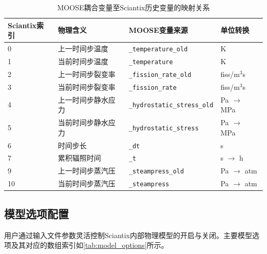 \begin{table}[htbp]
	\centering
	\caption{MOOSE耦合变量至Sciantix历史变量的映射关系}
	\label{tab:history_map}
	\begin{tabularx}{\textwidth}{lllX}
		\toprule
		Sciantix索引 & 物理含义 & MOOSE变量来源 & 单位转换 \\
		\midrule
		0 & 上一时间步温度 & \texttt{\_temperature\_old} & K \\
		1 & 当前时间步温度 & \texttt{\_temperature} & K \\
		2 & 上一时间步裂变率 & \texttt{\_fission\_rate\_old} & fiss/m$^3$s \\
		3 & 当前时间步裂变率 & \texttt{\_fission\_rate} & fiss/m$^3$s \\
		4 & 上一时间步静水应力 & \texttt{\_hydrostatic\_stress\_old} & Pa $\to$ MPa \\
		5 & 当前时间步静水应力 & \texttt{\_hydrostatic\_stress} & Pa $\to$ MPa \\
		6 & 时间步长 & \texttt{\_dt} & s \\
		7 & 累积辐照时间 & \texttt{\_t} & s $\to$ h \\
		9 & 上一时间步蒸汽压 & \texttt{\_steampress\_old} & Pa $\to$ atm \\
		10 & 当前时间步蒸汽压 & \texttt{\_steampress} & Pa $\to$ atm \\
		\bottomrule
	\end{tabularx}
\end{table}

\subsection{模型选项配置}
用户通过输入文件参数灵活控制Sciantix内部物理模型的开启与关闭。主要模型选项及其对应的数组索引如\tablename\ref{tab:model_options}所示。

